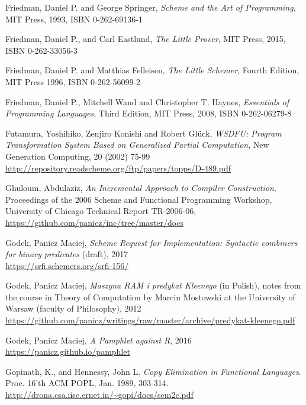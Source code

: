 \begin{thebibliography}{90}
  Friedman, Daniel P. and George Springer,
  \emph{Scheme and the Art of Programming},
  MIT Press, 1993, ISBN 0-262-69136-1

  Friedman, Daniel P., and Carl Eastlund,
  \emph{The Little Prover},
  MIT Press, 2015, ISBN 0-262-33056-3
  
  Friedman, Daniel P. and Matthias Felleisen,
  \emph{The Little Schemer},
  Fourth Edition, MIT Press 1996,
  ISBN 0-262-56099-2

  Friedman, Daniel P., Mitchell Wand and Christopher T. Haynes,
  \emph{Essentials of Programming Languages},
  Third Edition, MIT Press, 2008,
  ISBN 0-262-06279-8

  Futamura, Yoshihiko, Zenjiro Konishi and Robert Glück,
  \emph{WSDFU: Program Transformation System Based on Generalized Partial Computation},
  New Generation Computing, 20 (2002) 75-99 \\
  \url{http://repository.readscheme.org/ftp/papers/topps/D-489.pdf}

  Ghuloum, Abdulaziz, \emph{An Incremental Approach to Compiler Construction},
  Proceedings of the 2006 Scheme and Functional Programming Workshop,
  University of Chicago Technical Report TR-2006-06, \\
  \url{https://github.com/panicz/inc/tree/master/docs}

  Godek, Panicz Maciej, \emph{Scheme Request for Implementation: Syntactic
    combiners for binary predicates} (draft), 2017 \\
  \url{https://srfi.schemers.org/srfi-156/}

  Godek, Panicz Maciej, \emph{Maszyna RAM i predykat Kleenego} (in Polish),
  notes from the course in Theory of Computation by Marcin Mostowski at
  the University of Warsaw (faculty of Philosophy), 2012 \\
  \url{https://github.com/panicz/writings/raw/master/archive/predykat-kleenego.pdf}
  
  Godek, Panicz Maciej, \emph{A Pamphlet against R}, 2016 \\
  \url{https://panicz.github.io/pamphlet}

  Gopinath, K., and Hennessy, John L.
  \emph{Copy Elimination in Functional Languages}.
  Proc. 16'th ACM POPL, Jan. 1989, 303-314. \\
  \url{http://drona.csa.iisc.ernet.in/~gopi/docs/sem2c.pdf}
  

\end{thebibliography}
